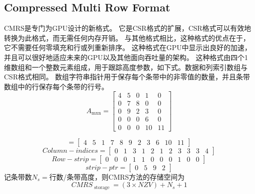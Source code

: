 \documentclass[forprint]{WHUBachelor}
\begin{document}
\subsection{Compressed Multi Row Format}
CMRS是专门为GPU设计的新格式\cite{Koza2014Sparse}。 它是CSR格式的扩展，CSR格式可以有效地转换为此格式，而无需任何内存开销。 与其他格式相比，这种格式的优点在于，它不需要任何零填充和行或列重新排序。 这种格式在GPU中显示出良好的加速，并且可以很好地适应未来的GPU以及其他面向吞吐量的架构。 这种格式由四个1维数组和一个整数元素组成，用于跟踪高度参数，如下式。数据和列索引数组与CSR格式相同。 数组字符串指针用于保存每个条带中的非零值的数量，并且条带数组中的行保存每个条带的行号。
\begin{equation} 
A_{\operatorname{mxn}}=\left[ \begin{array}{ccccc}{4} & {5} & {0} & {1} & {0} \\ {0} & {7} & {8} & {0} & {0} \\ {0} & {9} & {2} & {3} & {0} \\ {0} & {0} & {0} & {6} & {0} \\ {0} & {0} & {0} & {10} & {11}\end{array}\right]
 \end{equation}

\begin{equation} 
=\left[ \begin{array}{ccccccccccc}{4} & {5} & {1} & {7} & {8} & {9} & {2} & {3} & {6} & {10} & {11}\end{array}\right]
 \end{equation}
\begin{equation} 
Column-indices=\left[ \begin{array}{lllllllllll}{0} & {1} & {3} & {1} & {2} & {1} & {2} & {3} & {3} & {3} & {4}\end{array}\right]
 \end{equation}
\begin{equation} 
Row-strip = \left[ \begin{array}{lllllllllll}{0} & {0} & {0} & {1} & {1} & {0} & {0} & {0} & {1} & {0} & {0}\end{array}\right]
 \end{equation}
\begin{equation} 
strip-ptr=\left[ \begin{array}{cccc}{0} & {5} & {9} & {2}\end{array}\right]
 \end{equation}
记条带数$N_s=$行数/条带高度，则CMRS方法的存储空间为
\begin{equation} 
C M R S_{\text { storage }}=(3 \times N Z V)+N_{s}+1
 \end{equation}
\end{document}
